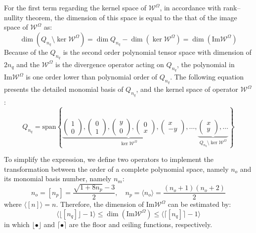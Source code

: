 For the first term regarding the kernel space of $\mathcal W^\Omega$,
in accordance with rank--nullity theorem\cite{strang2006}, the dimension of this space is equal to the that of the image space of $\mathcal W^\Omega$ as:
\begin{equation}
    \dim \left(Q_{n_q}\setminus \ker \mathcal W^\Omega\right) = \dim Q_{n_q} - \dim\left(\ker \mathcal W^\Omega\right) = \dim \left(\mathrm{Im} \mathcal W^\Omega\right)
\end{equation}
Because of the $Q_{n_q}$ is the second order polynomial tensor space with dimension of $2n_q$
and the $\mathcal W^\Omega$ is the divergence operator acting on $Q_{n_q}$, the polynomial in $\mathrm{Im} \mathcal W^\Omega$ is one order lower than polynomial order of $Q_{n_q}$.
The following equation presents the detailed monomial basis of $Q_{n_q}$, and the kernel space of operator $\mathcal W^\Omega$:
\begin{equation}
    Q_{n_q} = \mathrm{span} \left \{
        \underbrace{
        \begin{pmatrix}
            1 \\ 0
        \end{pmatrix},
        \begin{pmatrix}
            0 \\ 1
        \end{pmatrix},
        \begin{pmatrix}
            y \\ 0
        \end{pmatrix},
        \begin{pmatrix}
            0 \\ x
        \end{pmatrix},
        \begin{pmatrix}
            x \\ -y
        \end{pmatrix},
        \dots}_{\ker \mathcal W^\Omega}, 
        \underbrace{
        \begin{pmatrix}
            x \\ y
        \end{pmatrix},
        \dots}_{Q_{n_q}\setminus \ker \mathcal W^\Omega}
    \right \}
\end{equation}

To simplify the expression, we define two operators to implement the transformation between the order of a complete polynomial space, namely $n_o$ and its monomial basis number, namely $n_m$:
\begin{equation}
n_o = [n_p] = \frac{\sqrt{1+8n_p}-3}{2}
,\quad
n_p = \langle n_o \rangle = \frac{(n_o+1)(n_o+2)}{2}
\end{equation}
where $\langle [n] \rangle = n$.
Therefore, the dimension of $\mathrm{Im} \mathcal W^\Omega$ can be estimated by:
\begin{equation}\label{eq:dim_relation_3_1}
    \langle \lfloor [n_q] \rfloor - 1\rangle \le \dim(\mathrm{Im} \mathcal W^\Omega) \le \langle \lceil [n_q] \rceil -1 \rangle
\end{equation}
in which $\lfloor\bullet\rfloor$ and $\lceil\bullet\rceil$ are the floor and ceiling functions, respectively.


